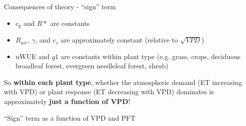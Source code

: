 \documentclass[aspectratio=169]{beamer}
\begin{document}
\begin{frame}{Consequences of theory - ``sign'' term}
\begin{overprint}
    \begin{itemize}
    \item $c_p$ and $R*$ are constants
    \item $R_{air}$, $\gamma$, and $c_s$ are approximately constant (relative to $\sqrt{VPD}$)
    \item uWUE and $g1$ are constants within plant type (e.g. grass, crops, deciduous broadleaf forest, evergreen needleleaf forest, shrub)
    \end{itemize}
    So \textbf{within each plant type}, whether the atmospheric demand (ET increasing with VPD) or plant response (ET decreasing with VPD) dominates is approximately \textbf{just a function of VPD}!
  \end{overprint}    
\end{frame}

\begin{frame}{``Sign'' term as a function of VPD and PFT}
  \begin{figure}
  \end{figure}
\end{frame}
\end{document}
